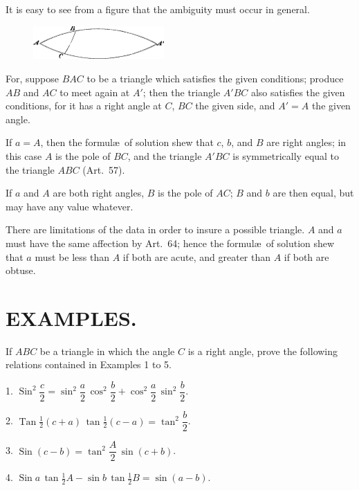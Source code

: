 \documentclass{book}[2004/02/16]
\begin{document}
\begin{mainmatter}
\begin{spacing}{1.3}
It is easy to see from a figure that the ambiguity must occur
in general.
\begin{figure}[htp]
\centering
\includegraphics[width=5.0cm]{images/053fc}
\end{figure}

For, suppose $BAC$ to be a triangle which satisfies the given
conditions; produce $AB$ and $AC$ to meet again at $A'$; then the
triangle $A'BC$ also satisfies the given conditions, for it has a right
angle at $C$, $BC$ the given side, and $A' = A$ the given angle.

If $a = A$, then the formul\ae\ of solution shew that $c$, $b$, and $B$
are right angles; in this case $A$ is the pole of $BC$, and the triangle
$A'BC$ is symmetrically equal to the triangle $ABC$ (Art.\ 57).

If $a$ and $A$ are both right angles, $B$ is the pole of $AC$; $B$ and $b$
are then equal, but may have any value whatever.

There are limitations of the data in order to insure a possible
triangle. $A$ and $a$ must have the same affection by Art.\ 64; hence
the formul\ae\ of solution shew that $a$ must be less than $A$ if both
are acute, and greater than $A$ if both are obtuse.

\section*{\centering\normalsize EXAMPLES.}

If $ABC$ be a triangle in which the angle $C$ is a right angle,
prove the following relations contained in Examples 1 to 5.
\medskip

1. $\operatorname{Sin}^2\dfrac{c}{2} =
                      \sin^2 \dfrac{a}{2}\, \cos^2 \dfrac{b}{2} +
                      \cos^2 \dfrac{a}{2}\, \sin^2 \dfrac{b}{2}$.
\medskip

2. $\operatorname{Tan}\tfrac{1}{2}(c + a)\,
                      \tan \tfrac{1}{2}(c - a) =
                      \tan^2 \dfrac{b}{2}$.
\medskip

3. $\operatorname{Sin}(c - b) = \tan^2 \dfrac{A}{2}\,\sin(c + b)$.
\medskip

4. $\operatorname{Sin} a\, \tan \tfrac{1}{2}A
                     - \sin b\, \tan \tfrac{1}{2}B = \sin (a - b)$.


\end{spacing}
\end{mainmatter}
\end{document}
